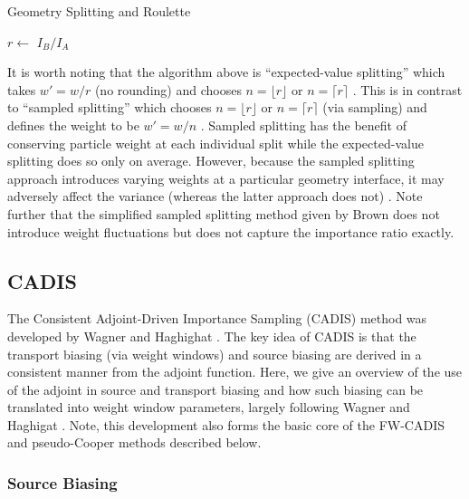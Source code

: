 \begin{algorithm}
 \label{alg:geom}
 \caption{Geometry Splitting and Roulette}
 $r \leftarrow$ $I_B/I_A$ \;
\end{algorithm}

It is worth noting that the algorithm above is  ``expected-value splitting''
which takes $ w' = w/r$ (\ie no rounding) and  chooses $n = \lfloor r \rfloor $
or $ n= \lceil r \rceil$ \cite{booth1985mcv}.  This is in contrast to ``sampled
splitting'' which chooses  $n = \lfloor r \rfloor$ or $ n = \lceil r \rceil$
(via sampling) and  defines the weight to be $w'=w/n$ \cite{booth1985mcv}.  
Sampled splitting has the benefit of conserving particle weight at each
individual split while the expected-value splitting does so only on average. 
However, because the sampled splitting approach introduces varying weights at a
particular geometry interface, it may adversely affect the variance (whereas the
latter approach does not) \cite{haghighat2003mcv}.  Note further that the
simplified sampled splitting method given by Brown \cite{brown2005fmc} does not
introduce weight fluctuations but does not capture the importance ratio exactly.

\subsection{CADIS}

The Consistent Adjoint-Driven Importance Sampling (CADIS) method was developed
by Wagner and Haghighat \cite{wagner1998avr}.  The key idea of CADIS is that the
transport biasing (via weight windows) and source biasing are derived in a
consistent manner from the adjoint function.  Here, we give an overview of the
use of the adjoint in source and transport biasing and how such biasing can be
translated into weight window parameters, largely following Wagner and Haghigat
\cite{wagner1998avr}.  Note, this development also forms the basic core of the
FW-CADIS and pseudo-Cooper methods described below.

\subsubsection{Source Biasing}

